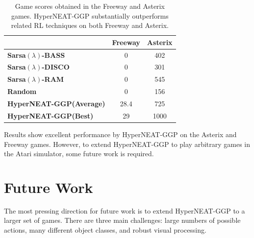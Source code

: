 \documentclass{acm_proc_article-sp}
\begin{document}

\begin{table}
\begin{center}
\begin{tabular}{|l|c|c|}
\hline
~ & \textbf{Freeway} & \textbf{Asterix} \\ \hline
\textbf{Sarsa$(\lambda)$-BASS} & 0 & 402 \\ \hline
\textbf{Sarsa$(\lambda)$-DISCO} & 0 & 301 \\ \hline
\textbf{Sarsa$(\lambda)$-RAM} & 0 & 545 \\ \hline
\textbf{Random} & 0 & 156 \\ \hline
\textbf{HyperNEAT-GGP(Average)} & 28.4 & 725 \\ \hline
\textbf{HyperNEAT-GGP(Best)} & 29 & 1000 \\ 
\hline
\end{tabular}
\end{center}
\label{tab:results-table}
\caption{Game scores obtained in the Freeway and Asterix games. HyperNEAT-GGP substantially outperforms related RL techniques on both Freeway and Asterix.}
\end{table}

Results show excellent performance by HyperNEAT-GGP on the Asterix and Freeway games. However, to extend HyperNEAT-GGP to play arbitrary games in the Atari simulator, some future work is required.

\section{Future Work}
\label{sec:futurework}
The most pressing direction for future work is to extend HyperNEAT-GGP to a larger set of games. There are three main challenges: large numbers of possible actions, many different object classes, and robust visual processing.
\end{document}
